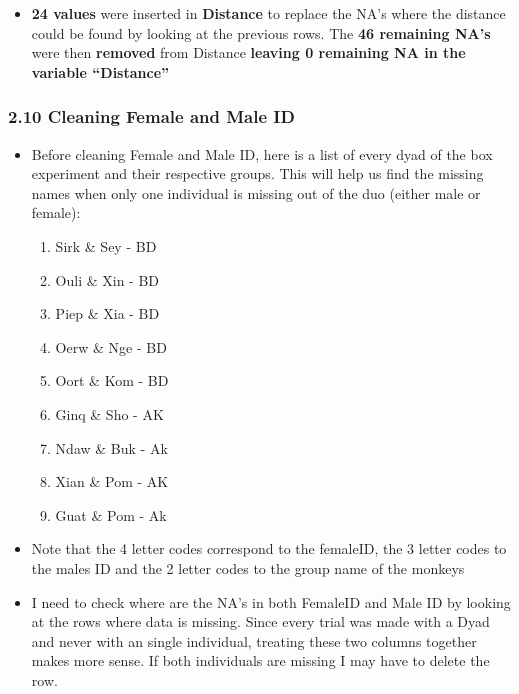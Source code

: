 \documentclass[
]{article}
\providecommand{\tightlist}{%
  \setlength{\itemsep}{0pt}\setlength{\parskip}{0pt}}
\begin{document}
\begin{itemize}
\tightlist
\item
  \textbf{24 values} were inserted in \textbf{Distance} to replace the
  NA's where the distance could be found by looking at the previous
  rows. The \textbf{46 remaining NA's} were then \textbf{removed} from
  Distance \textbf{leaving 0 remaining NA in the variable ``Distance''}
\end{itemize}

\hypertarget{cleaning-female-and-male-id}{%
\subsubsection{2.10 Cleaning Female and Male
ID}\label{cleaning-female-and-male-id}}

\begin{itemize}
\item
  Before cleaning Female and Male ID, here is a list of every dyad of
  the box experiment and their respective groups. This will help us find
  the missing names when only one individual is missing out of the duo
  (either male or female):

  \begin{enumerate}
  \def\labelenumi{\alph{enumi}.}
  \item
    Sirk \& Sey - BD
  \item
    Ouli \& Xin - BD
  \item
    Piep \& Xia - BD
  \item
    Oerw \& Nge - BD
  \item
    Oort \& Kom - BD
  \item
    Ginq \& Sho - AK
  \item
    Ndaw \& Buk - Ak
  \item
    Xian \& Pom - AK
  \item
    Guat \& Pom - Ak
  \end{enumerate}
\item
  Note that the 4 letter codes correspond to the femaleID, the 3 letter
  codes to the males ID and the 2 letter codes to the group name of the
  monkeys
\item
  I need to check where are the NA's in both FemaleID and Male ID by
  looking at the rows where data is missing. Since every trial was made
  with a Dyad and never with an single individual, treating these two
  columns together makes more sense. If both individuals are missing I
  may have to delete the row.
\end{itemize}
\end{document}
